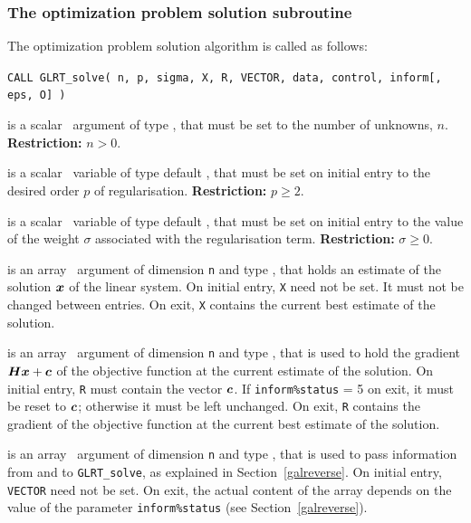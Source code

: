 \documentclass{galahad}
\newcommand{\packagename}{GL\-RT}
\begin{document}

\subsubsection{The optimization problem solution subroutine}
The optimization problem solution algorithm is called as follows:

\hskip0.5in
{\tt CALL \packagename\_solve( n, p, sigma, X, R, VECTOR, data, control, inform[, eps, O] )}

\begin{description}

 is a scalar \intentin\ argument of type \integer, that must be
set to the number of unknowns, $n$. {\bf Restriction: } $n  >  0$.

 is a scalar \intentin\ variable of type default
\realdp,
that must be set on initial entry to the desired order $p$ of regularisation.
{\bf Restriction: } $p \geq 2$.

 is a scalar \intentin\ variable of type default
\realdp,
that must be set on initial entry
to the value of the weight $\sigma$ associated with the regularisation term.
{\bf Restriction: } $\sigma \geq 0$.

 is an array \intentinout\ argument of dimension {\tt n} and
type \realdp,
that holds an estimate of the solution ${\bm{x}}$ of the linear system.
On initial entry, {\tt X} need not be set.
It must not be changed between entries.
On exit, {\tt X} contains the current best estimate of the solution.

 is an array \intentinout\ argument of dimension {\tt n} and
type \realdp,
that is used to hold the gradient ${\bm{H}} {\bm{x}}  +  {\bm{c}}$ of the objective
function at the current estimate of the solution.
On initial entry, {\tt R} must contain the vector ${\bm{c}}$.
If {\tt inform\%status} = 5 on exit, it must be reset to  ${\bm{c}}$; otherwise
it must be left unchanged. On exit, {\tt R} contains the gradient of the
objective   function at the current best estimate of the solution.

 is an array \intentinout\ argument of dimension {\tt n}
and type \realdp,
that is used to pass information from and to {\tt \packagename\_solve},
as explained in Section~\ref{galreverse}.
On initial entry, {\tt VECTOR} need not be set. On exit, the actual content of
the array depends on the value of the parameter {\tt inform\%status}
(see Section~\ref{galreverse}).


\end{description}
\end{document}
